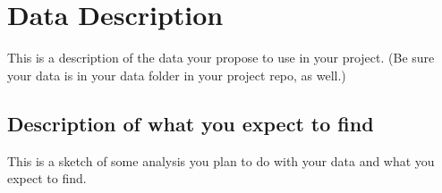 \documentclass[manuscript,authorversion,nonacm]{acmart} %
\begin{document}
\section{Data Description}

This is a description of the data your propose to use in your project. (Be sure your data is in your data folder in your project repo, as well.)

\subsection{Description of what you expect to find} 

This is a sketch of some analysis you plan to do with your data and what you expect to find.


\newpage




\newpage 
\appendix
\end{document}
